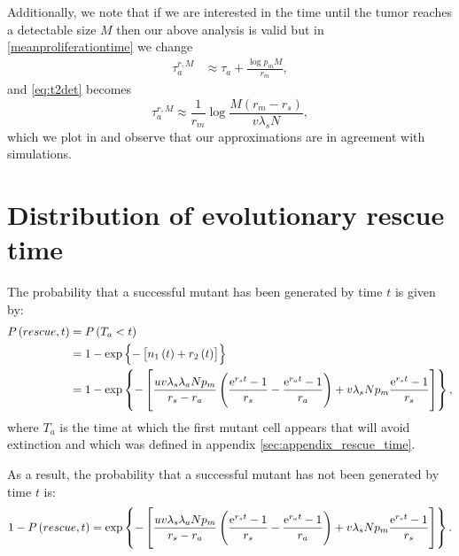 \documentclass[12pt]{extarticle}
\newcommand{\e}{{\rm e}}
\renewcommand{\Delta}{r}
\begin{document}
\begin{appendices}
Additionally, we note that if we are interested in the time until the tumor reaches a detectable size $M$ then our above analysis is valid but in \cref{meanproliferationtime} we change
\begin{align}\label{meanproliferationtime2}
\tau_a^{r,M}&\approx\tau_a+\frac{\log p_mM}{\Delta_m},
\end{align}
and \cref{eq:t2det} becomes
\begin{equation}\label{eq:t2det2}
\tau_a^{r,M}\approx\frac{1}{\Delta_m}\log\frac{M\left(\Delta_m-\Delta_s\right)}{v\lambda_sN},
\end{equation}
which we plot in  and observe that our approximations are in agreement with simulations.

\section{Distribution of evolutionary rescue time}\label{sec:appendix_distribution_time}
The probability that a successful mutant has been generated by time $t$ is given by:
\begin{align*}
P\left(rescue,t\right)&=P\left(T_a<t\right)\\
&=1-\exp\left\{-\left[n_1\left(t\right)+r_2\left(t\right)\right]\right\}\\
&=1-\exp\left\{-\left[\frac{uv\lambda_s\lambda_aNp_m}{\Delta_s-\Delta_a}\left(\frac{\e^{\Delta_st}-1}{\Delta_s}-\frac{\e^{\Delta_at}-1}{\Delta_a}\right)+ v\lambda_sNp_m\frac{\e^{\Delta_s t}-1}{\Delta_s}\right]\right\},
\end{align*}
where $T_a$ is the time at which the first mutant cell appears that will avoid extinction and which was defined in appendix \ref{sec:appendix_rescue_time}.

As a result, the probability that a successful mutant has not been generated by time $t$ is:
\begin{equation}
1-P\left(rescue,t\right)=\exp\left\{-\left[\frac{uv\lambda_s\lambda_aNp_m}{\Delta_s-\Delta_a}\left(\frac{\e^{\Delta_st}-1}{\Delta_s}-\frac{\e^{\Delta_at}-1}{\Delta_a}\right)+ v\lambda_sNp_m\frac{\e^{\Delta_s t}-1}{\Delta_s}\right]\right\}.
\end{equation}

\end{appendices}
\end{document}
